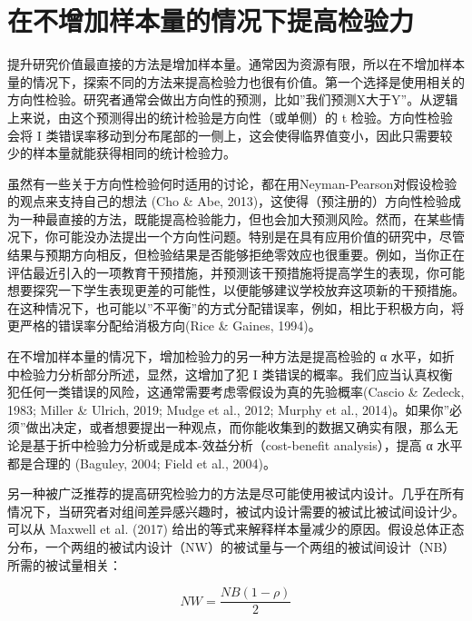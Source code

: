 \documentclass[
  letterpaper,
  DIV=11,
  numbers=noendperiod]{scrreprt}
\begin{document}
\hypertarget{ux5728ux4e0dux589eux52a0ux6837ux672cux91cfux7684ux60c5ux51b5ux4e0bux63d0ux9ad8ux68c0ux9a8cux529b}{%
\section{在不增加样本量的情况下提高检验力}\label{ux5728ux4e0dux589eux52a0ux6837ux672cux91cfux7684ux60c5ux51b5ux4e0bux63d0ux9ad8ux68c0ux9a8cux529b}}

提升研究价值最直接的方法是增加样本量。通常因为资源有限，所以在不增加样本量的情况下，探索不同的方法来提高检验力也很有价值。第一个选择是使用相关的方向性检验。研究者通常会做出方向性的预测，比如''我们预测X大于Y''。从逻辑上来说，由这个预测得出的统计检验是方向性（或单侧）的
t 检验。方向性检验会将 I
类错误率移动到分布尾部的一侧上，这会使得临界值变小，因此只需要较少的样本量就能获得相同的统计检验力。

虽然有一些关于方向性检验何时适用的讨论，都在用Neyman-Pearson对假设检验的观点来支持自己的想法
(Cho \& Abe,
2013)，这使得（预注册的）方向性检验成为一种最直接的方法，既能提高检验能力，但也会加大预测风险。然而，在某些情况下，你可能没办法提出一个方向性问题。特别是在具有应用价值的研究中，尽管结果与预期方向相反，但检验结果是否能够拒绝零效应也很重要。例如，当你正在评估最近引入的一项教育干预措施，并预测该干预措施将提高学生的表现，你可能想要探究一下学生表现更差的可能性，以便能够建议学校放弃这项新的干预措施。在这种情况下，也可能以''不平衡''的方式分配错误率，例如，相比于积极方向，将更严格的错误率分配给消极方向(Rice
\& Gaines, 1994)。

在不增加样本量的情况下，增加检验力的另一种方法是提高检验的 α
水平，如折中检验力分析部分所述，显然，这增加了犯 I
类错误的概率。我们应当认真权衡犯任何一类错误的风险，这通常需要考虑零假设为真的先验概率(Cascio
\& Zedeck, 1983; Miller \& Ulrich, 2019; Mudge et al., 2012; Murphy et
al.,
2014)。如果你''必须''做出决定，或者想要提出一种观点，而你能收集到的数据又确实有限，那么无论是基于折中检验力分析或是成本-效益分析（cost-benefit
analysis），提高 α 水平都是合理的 (Baguley, 2004; Field et al., 2004)。

另一种被广泛推荐的提高研究检验力的方法是尽可能使用被试内设计。几乎在所有情况下，当研究者对组间差异感兴趣时，被试内设计需要的被试比被试间设计少。可以从
Maxwell et al. (2017)
给出的等式来解释样本量减少的原因。假设总体正态分布，一个两组的被试内设计（NW）的被试量与一个两组的被试间设计（NB）所需的被试量相关：

\[NW = \frac{NB (1-\rho)}{2}\]
\end{document}
